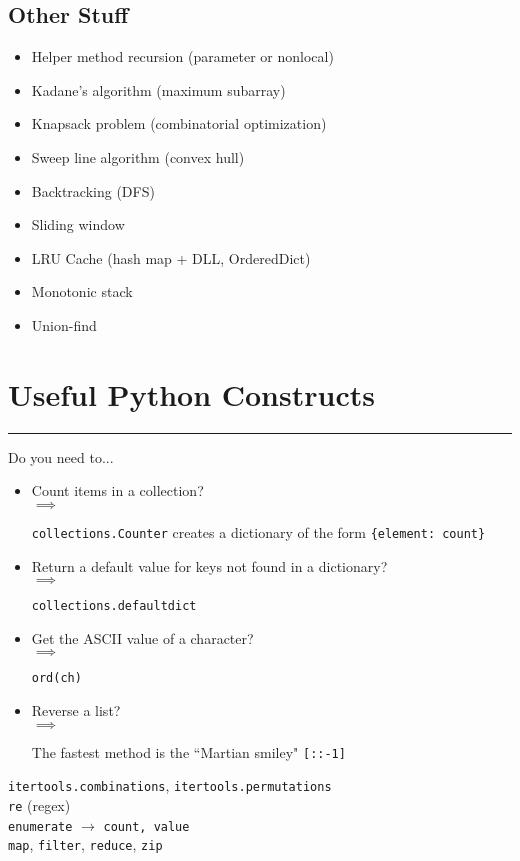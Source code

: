 \documentclass[12pt]{article}
\newcommand{\imply}[1]{
  \-\hspace{1em}$\implies$ \parbox[t]{11.2cm}{#1}
}
\begin{document}
\subsection*{Other Stuff}

\begin{itemize}
  \item Helper method recursion (parameter or nonlocal)
  \item Kadane's algorithm (maximum subarray)
  \item Knapsack problem (combinatorial optimization)
  \item Sweep line algorithm (convex hull)
  \item Backtracking (DFS)
  \item Sliding window
  \item LRU Cache (hash map + DLL, OrderedDict)
  \item Monotonic stack
  \item Union-find
\end{itemize}

\section*{Useful Python Constructs}
\hrule\vspace{5ex}

Do you need to...
\begin{itemize}
  \item Count items in a collection? \smallskip\\
    \imply{\texttt{collections.Counter} creates a dictionary of the form \texttt{\{element: count\}}}
  \item Return a default value for keys not found in a dictionary? \smallskip\\
    \imply{\texttt{collections.defaultdict}}
  \item Get the ASCII value of a character? \smallskip\\
    \imply{\texttt{ord(ch)}}
  \item Reverse a list? \smallskip\\
    \imply{The fastest method is the ``Martian smiley" \texttt{[::-1]}}
\end{itemize}

\texttt{itertools.combinations}, \texttt{itertools.permutations} \\
\texttt{re} (regex) \\
\texttt{enumerate} $\rightarrow$ \texttt{count, value} \\
\texttt{map}, \texttt{filter}, \texttt{reduce}, \texttt{zip}
\end{document}
